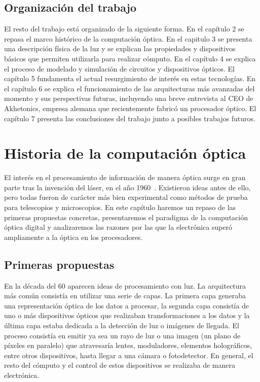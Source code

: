 \documentclass[12pt,a4paper]{report}
\begin{document}
\section{Organización del trabajo}

El resto del trabajo está organizado de la siguiente forma. En el capítulo 2 se repasa el marco histórico de la computación óptica. En el capitulo 3 se presenta una descripción física de la luz y se explican las propiedades y dispositivos básicos que permiten utilizarla para realizar cómputo. En el capítulo 4 se explica el proceso de modelado y simulación de circuitos y dispositivos ópticos. El capítulo 5 fundamenta el actual resurgimiento de interés en estas tecnologías. En el capítulo 6 se explica el funcionamiento de las arquitecturas más avanzadas del momento y sus perspectivas futuras, incluyendo una breve entrevista al CEO de Akhetonics, empresa alemana que recientemente fabricó un procesador óptico. El capítulo 7 presenta las conclusiones del trabajo junto a posibles trabajos futuros.

\chapter{Historia de la computación óptica}

El interés en el procesamiento de información de manera óptica surge en gran parte tras la invención del láser, en el año 1960~\cite{history_optical_computing}. Existieron ideas antes de ello, pero todas fueron de carácter más bien experimental como métodos de prueba para telescopios y microscopios. En este capítulo haremos un repaso de las primeras propuestas concretas, presentaremos el paradigma de la computación óptica digital y analizaremos las razones por las que la electrónica superó ampliamente a la óptica en los procesadores.

\section{Primeras propuestas}

En la década del 60 aparecen ideas de procesamiento con luz. La arquitectura más común consistía en utilizar una serie de capas. La primera capa generaba una representación óptica de los datos a procesar, la segunda capa consistía de uno o más dispositivos ópticos que realizaban transformaciones a los datos y la última capa estaba dedicada a la detección de luz o imágenes de llegada. El proceso consistía en emitir ya sea un rayo de luz o una imagen (un plano de píxeles en paralelo) que atravesaría lentes, moduladores, elementos holográficos, entre otros dispositivos, hasta llegar a una cámara o fotodetector. En general, el resto del cómputo y el control de estos dispositivos se realizaba de manera electrónica.
\end{document}
